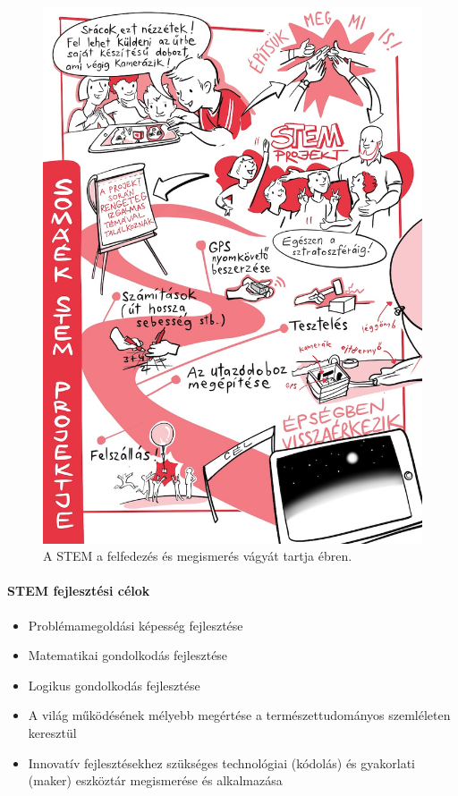 \begin{figure}
\centering
\includegraphics{pics/2a_stem.jpg}
\caption{A STEM a felfedezés és megismerés vágyát tartja ébren.}
\end{figure}

\hypertarget{stem-fejlesztesi-celok}{%
\paragraph{STEM fejlesztési célok}\label{stem-fejlesztesi-celok}}

\begin{itemize}
\tightlist
\item
  Problémamegoldási képesség fejlesztése
\item
  Matematikai gondolkodás fejlesztése
\item
  Logikus gondolkodás fejlesztése
\item
  A világ működésének mélyebb megértése a természettudományos
  szemléleten keresztül
\item
  Innovatív fejlesztésekhez szükséges technológiai (kódolás) és
  gyakorlati (maker) eszköztár megismerése és alkalmazása
\end{itemize}

